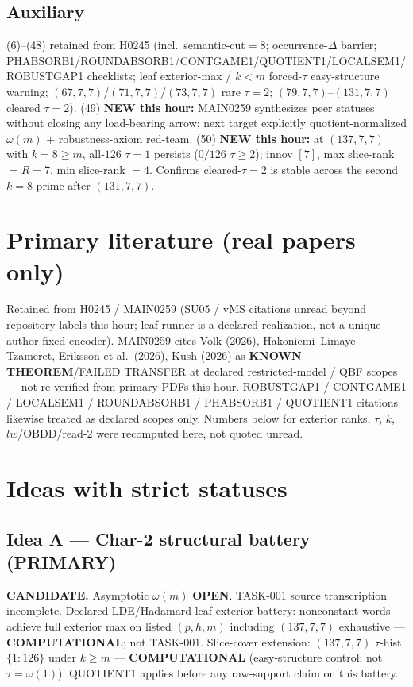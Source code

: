 \documentclass[11pt]{article}
\begin{document}
\subsection*{Auxiliary}
(6)--(48) retained from H0245 (incl.\ semantic-cut$=8$; occurrence-$\Delta$ barrier;
PHABSORB1/ROUNDABSORB1/CONTGAME1/QUOTIENT1/LOCALSEM1/ROBUSTGAP1 checklists; leaf exterior-max / $k{<}m$ forced-$\tau$ easy-structure warning;
$(67,7,7)$/$(71,7,7)$/$(73,7,7)$ rare $\tau{=}2$; $(79,7,7)$--$(131,7,7)$ cleared $\tau{=}2$).
(49) \textbf{NEW this hour:} MAIN0259 synthesizes peer statuses without closing any load-bearing
arrow; next target explicitly quotient-normalized $\omega(m)$ + robustness-axiom red-team.
(50) \textbf{NEW this hour:} at $(137,7,7)$ with $k{=}8{\ge}m$, all-$126$ $\tau{=}1$ persists
($0/126$ $\tau{\ge}2$); innov $[7]$, max slice-rank $=R{=}7$, min slice-rank $=4$.
Confirms cleared-$\tau{=}2$ is stable across the second $k{=}8$ prime after $(131,7,7)$.

\section*{Primary literature (real papers only)}
Retained from H0245 / MAIN0259 (SU05 / vMS citations unread beyond repository labels this hour;
leaf runner is a declared realization, not a unique author-fixed encoder).
MAIN0259 cites Volk (2026), Hakoniemi--Limaye--Tzameret, Eriksson et al.\ (2026), Kush (2026)
as \textbf{KNOWN THEOREM}/FAILED TRANSFER at declared restricted-model / QBF scopes ---
not re-verified from primary PDFs this hour.
ROBUSTGAP1 / CONTGAME1 / LOCALSEM1 / ROUNDABSORB1 / PHABSORB1 / QUOTIENT1 citations likewise
treated as declared scopes only.
Numbers below for exterior ranks, $\tau$, $k$, $lw$/OBDD/read-$2$
were recomputed here, not quoted unread.

\section*{Ideas with strict statuses}
\subsection*{Idea A --- Char-2 structural battery (PRIMARY)}
\textbf{CANDIDATE.} Asymptotic $\omega(m)$ \textbf{OPEN}. TASK-001 source transcription incomplete.
Declared LDE/Hadamard leaf exterior battery: nonconstant words achieve full exterior max on
listed $(p,h,m)$ including $(137,7,7)$ exhaustive --- \textbf{COMPUTATIONAL}; not TASK-001.
Slice-cover extension: $(137,7,7)$ $\tau$-hist $\{1{:}126\}$ under $k{\ge}m$ ---
\textbf{COMPUTATIONAL} (easy-structure control; not $\tau=\omega(1)$).
QUOTIENT1 applies before any raw-support claim on this battery.
\end{document}
